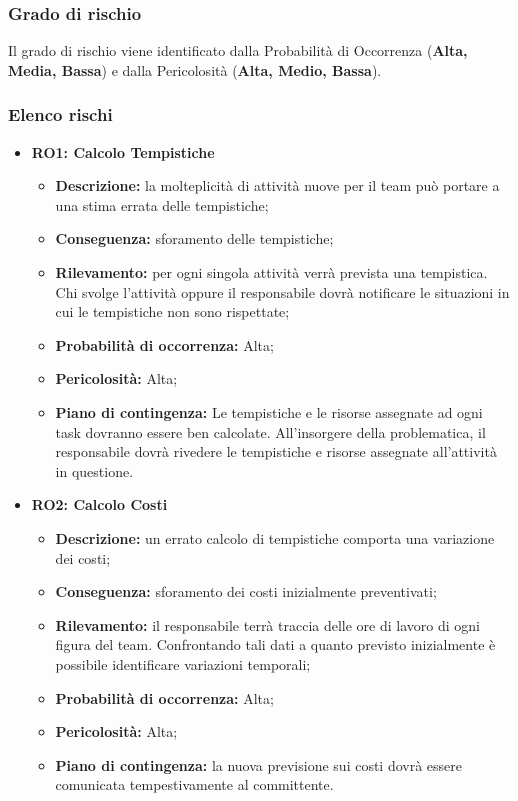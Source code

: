 \subsubsection{Grado di rischio}
Il grado di rischio viene identificato dalla Probabilità di Occorrenza (\textbf{Alta, Media, Bassa}) e dalla Pericolosità (\textbf{Alta, Medio, Bassa}).
\subsubsection{Elenco rischi}

\begin{itemize}
	\item \textbf{RO1: Calcolo Tempistiche}
	\begin{itemize}
		\item \textbf{Descrizione:} la molteplicità di attività nuove per il team può portare a una stima errata delle tempistiche;
		\item \textbf{Conseguenza:} sforamento delle tempistiche;
		\item \textbf{Rilevamento:} per ogni singola attività verrà prevista una tempistica. Chi svolge l'attività oppure il responsabile dovrà notificare le situazioni in cui le tempistiche non sono rispettate;
		\item \textbf{Probabilità di occorrenza:} Alta;
		\item \textbf{Pericolosità:} Alta;
		\item \textbf{Piano di contingenza:} Le tempistiche e le risorse assegnate ad ogni task dovranno essere ben calcolate. All'insorgere della problematica, il responsabile dovrà rivedere le tempistiche e risorse assegnate all'attività in questione.
	\end{itemize}
	
	\item \textbf{RO2: Calcolo Costi}
	\begin{itemize}
		\item \textbf{Descrizione:} un errato calcolo di tempistiche comporta una variazione dei costi;
		\item \textbf{Conseguenza:} sforamento dei costi inizialmente preventivati;
		\item \textbf{Rilevamento:} il responsabile terrà traccia delle ore di lavoro di ogni figura del team. Confrontando tali dati a quanto previsto inizialmente è possibile identificare variazioni temporali;
		\item \textbf{Probabilità di occorrenza:} Alta;
		\item \textbf{Pericolosità:} Alta;
		\item \textbf{Piano di contingenza:} la nuova previsione sui costi dovrà essere comunicata tempestivamente al committente.
	\end{itemize}
	

\end{itemize}
